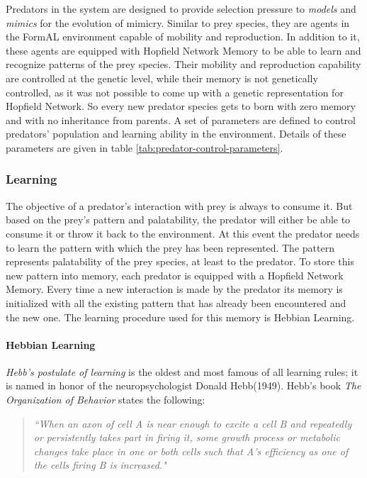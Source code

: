 \documentclass[letterpaper]{article}
\numberwithin{equation}{section}
\begin{document}
Predators in the system are designed to provide selection pressure to \textit{models} and \textit{mimics} for the evolution of mimicry. Similar to prey species, they are agents in the FormAL environment capable of mobility and reproduction. In addition to it, these agents are equipped with Hopfield Network Memory to be able to learn and recognize patterns of the prey species. Their mobility and reproduction capability are controlled at the genetic level, while their memory is not genetically controlled, as it was not possible to come up with a genetic representation for Hopfield Network. So every new predator species gets to born with zero memory and with no inheritance from parents. A set of parameters are defined to control predators' population and learning ability in the environment. Details of these parameters are given in table \ref{tab:predator-control-parameters}.

\subsubsection{Learning}
The objective of a predator's interaction with prey is always to consume it. But based on the prey's pattern and palatability, the predator will either be able to consume it or throw it back to the environment. At this event the predator needs to learn the pattern with which the prey has been represented. The pattern represents palatability of the prey species, at least to the predator. To store this new pattern into memory, each predator is equipped with a Hopfield Network Memory. Every time a new interaction is made by the predator its memory is initialized with all the existing pattern that has already been encountered and the new one. The learning procedure used for this memory is Hebbian Learning. 

\paragraph{Hebbian Learning}
\textit{Hebb's postulate of learning} is the oldest and most famous of all learning rules; it is named in honor of the neuropsychologist Donald Hebb(1949). Hebb's book \textit{The Organization of Behavior} \cite{hebb1949} states the following:

\begin{quote}
\textsl{``When an axon of cell A is near enough to excite a cell B and repeatedly or persistently takes part in firing it, some growth process or metabolic changes take place in one or both cells such that A's efficiency as one of the cells firing B is increased."}
\end{quote}
\end{document}
